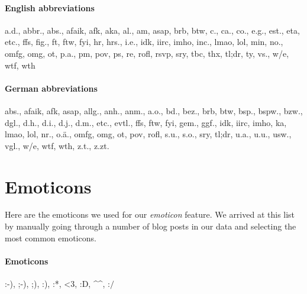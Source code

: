 \paragraph{English abbreviations}
a.d., abbr., abs., afaik, afk, aka, al., am, asap, brb, btw, c., ca., co., e.g., est., eta, etc., ffs, fig., ft, ftw, fyi, hr, hrs., i.e., idk, iirc, imho, inc., lmao, lol, min, no., omfg, omg, ot, p.a., pm, pov, ps, re, rofl, rsvp, sry, tbc, thx, tl;dr, ty, vs., w/e, wtf, wth


\paragraph{German abbreviations}
abs., afaik, afk, asap, allg., anh., anm., a.o., bd., bez., brb, btw, bsp., bspw., bzw., dgl., d.h., d.i., d.j., d.m., etc., evtl., ffs, ftw, fyi, gem., ggf., idk, iirc, imho, ka, lmao, lol, nr., o.ä., omfg, omg, ot, pov, rofl, s.u., s.o., sry, tl;dr, u.a., u.u., usw., vgl., w/e, wtf, wth, z.t., z.zt.

\section{Emoticons}
\label{sec:app_emoticons}
Here are the emoticons we used for our \textit{emoticon} feature. We arrived at this list by manually going through a number of blog posts in our data and selecting the most common emoticons.


\paragraph{Emoticons}
:-), ;-), ;), :), :*, <3, :D, \textasciicircum\textasciicircum, :$/$